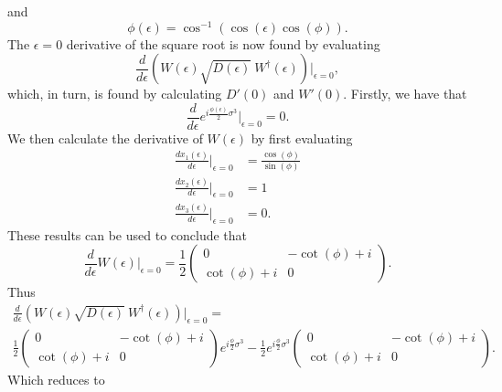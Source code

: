 \documentclass[12pt]{amsart}
\theoremstyle{definition}
\theoremstyle{remark}
\numberwithin{equation}{section}
\begin{document}
and
\begin{equation}
	\phi(\epsilon) = \cos^{-1}(\cos(\epsilon)\cos(\phi)).
\end{equation}
The $\epsilon=0$ derivative of the square root is now found by evaluating
\begin{equation}
	\frac{d}{d\epsilon} \left(W (\epsilon) \sqrt{D(\epsilon)}\ W^\dag(\epsilon)\right)\bigg|_{\epsilon =0},
\end{equation}
which, in turn, is found by calculating $D'(0)$ and $W'(0)$. Firstly, we have that 
\begin{equation}
	\frac{d}{d\epsilon} e^{i\frac{\phi(\epsilon)}{2}\sigma^3}\bigg|_{\epsilon=0} = 0.
\end{equation}
We then calculate the derivative of $W(\epsilon)$ by first evaluating
\begin{equation}
	\begin{split}
		\frac{dx_1(\epsilon)}{d\epsilon}\bigg|_{\epsilon=0} &= \frac{\cos(\phi)}{\sin(\phi)}\\
		\frac{dx_2(\epsilon)}{d\epsilon}\bigg|_{\epsilon=0} &= 1\\
		\frac{dx_3(\epsilon)}{d\epsilon}\bigg|_{\epsilon=0} &= 0.
	\end{split}
\end{equation}
These results can be used to conclude that
\begin{equation}
	\frac{d}{d\epsilon} W(\epsilon)\bigg|_{\epsilon=0} = \frac{1}{{2}}\begin{pmatrix} 0 & -\cot(\phi)+i\\ \cot(\phi)+i & 0\end{pmatrix}.
\end{equation}
Thus
\begin{multline}
	\frac{d}{d\epsilon} \left(W (\epsilon) \sqrt{D(\epsilon)}\ W^\dag(\epsilon)\right)\bigg|_{\epsilon =0} =\\ \frac{1}{{2}}\begin{pmatrix} 0 & -\cot(\phi)+i\\ \cot(\phi)+i & 0\end{pmatrix} e^{i\frac{\phi}{2} \sigma^3}
- \frac{1}{{2}}e^{i\frac{\phi}{2} \sigma^3}\begin{pmatrix} 0 & -\cot(\phi)+i\\ \cot(\phi)+i & 0\end{pmatrix}.
\end{multline}
Which reduces to
\end{document}
